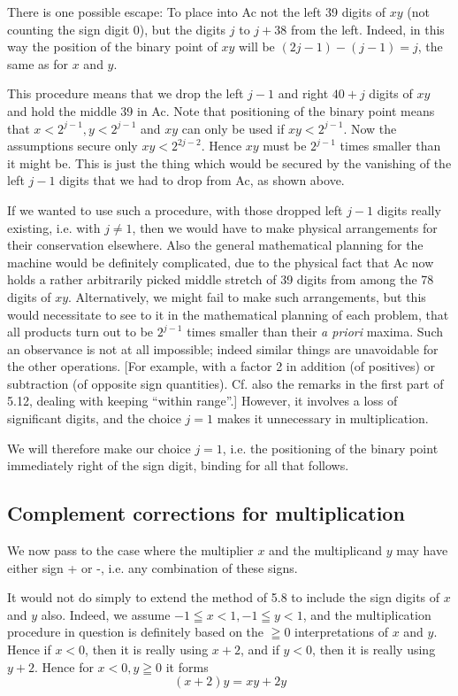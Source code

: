 \documentclass[12pt]{amsart}
\begin{document}
There is one possible escape: To place into Ac not the left 39 digits of $xy$ (not counting the sign digit 0), but the digits $j$ to $j + 38$ from the left. Indeed, in this way the position of the binary point of $xy$ will be $(2j - 1) - (j - 1) = j$, the same as for $x$ and $y$.

This procedure means that we drop the left $j - 1$ and right $40 + j$ digits of $xy$ and hold the middle 39 in Ac. Note that positioning of the binary point means that $x < 2^{j - 1}, y < 2^{j - 1}$ and $xy$ can only be used if $xy < 2^{j-1}$. Now the assumptions secure only $xy < 2^{2j - 2}$. Hence $xy$ must be $2^{j-1}$ times smaller than it might be. This is just the thing which would be secured by the vanishing of the left $j - 1$ digits that we had to drop from Ac, as shown above.

If we wanted to use such a procedure, with those dropped left $j - 1$ digits really existing, i.e. with $j \neq 1$, then we would have to make physical arrangements for their conservation elsewhere. Also the general mathematical planning for the machine would be definitely complicated, due to the physical fact that Ac now holds a rather arbitrarily picked middle stretch of 39 digits from among the 78 digits of $xy$. Alternatively, we might fail to make such arrangements, but this would necessitate to see to it in the mathematical planning of each problem, that all products turn out to be $2^{j-1}$ times smaller than their \emph{a priori} maxima. Such an observance is not at all impossible; indeed similar things are unavoidable for the other operations. [For example, with a factor 2 in addition (of positives) or subtraction (of opposite sign quantities). Cf. also the remarks in the first part of 5.12, dealing with keeping ``within range''.] However, it involves a loss of significant digits, and the choice $j = 1$ makes it unnecessary in multiplication.

We will therefore make our choice $j = 1$, i.e. the positioning of the binary point immediately right of the sign digit, binding for all that follows.

\subsection{Complement corrections for multiplication}
We now pass to the case where the multiplier $x$ and the multiplicand $y$ may have either sign + or -, i.e. any combination of these signs.

It would not do simply to extend the method of 5.8 to include the sign digits of $x$ and $y$ also. Indeed, we assume $-1 \leqq x < 1, -1 \leqq y < 1$, and the multiplication procedure in question is definitely based on the $\geqq 0$ interpretations of $x$ and $y$. Hence if $x < 0$, then it is really using $x + 2$, and if $y < 0$, then it is really using $y + 2$. Hence for $x < 0, y \geqq 0$ it forms
\[
(x + 2)y = xy + 2y
\]
\end{document}
